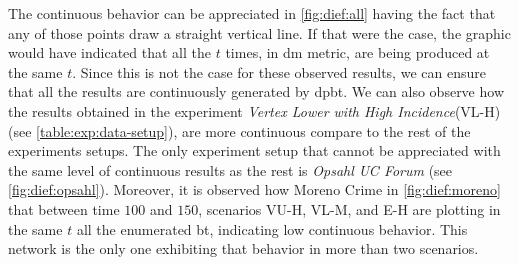The continuous behavior can be appreciated in \autoref{fig:dief:all} having the fact that any of those points draw a straight vertical line. 
If that were the case, the graphic would have indicated that all the $t$ times, in \acrshort{dm} metric, are being produced at the same $t$.
Since this is not the case for these observed results, we can ensure that all the results are continuously generated by \acrshort{dpbt}.
We can also observe how the results obtained in the experiment \emph{Vertex Lower with High Incidence}(VL-H) (see \autoref{table:exp:data-setup}), are more continuous compare to the rest of the experiments setups. 
The only experiment setup that cannot be appreciated with the same level of continuous results as the rest is \emph{Opsahl UC Forum} (see \autoref{fig:dief:opsahl}). 
Moreover, it is observed how Moreno Crime in \autoref{fig:dief:moreno} that between time $100$ and $150$, scenarios VU-H, VL-M, and E-H are plotting in the same $t$ all the enumerated \acrshort{bt}, indicating low continuous behavior. 
This network is the only one exhibiting that behavior in more than two scenarios.


